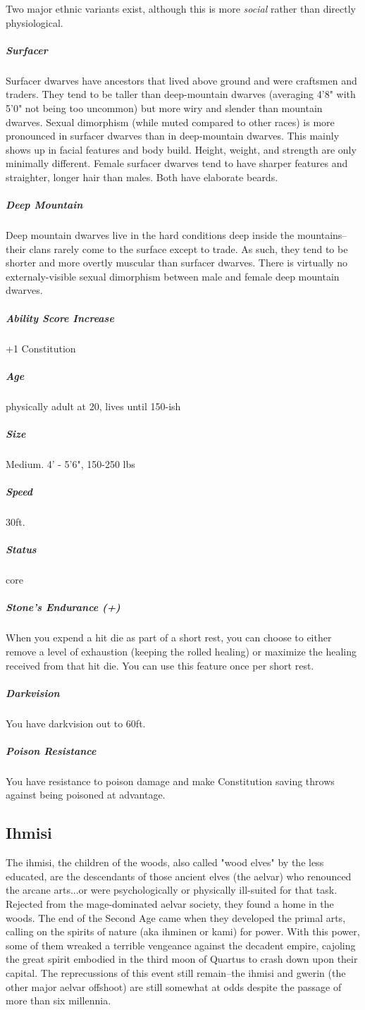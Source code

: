 Two major ethnic variants exist, although this is more \textit{social} rather than directly physiological.

\subparagraph*{Surfacer} Surfacer dwarves have ancestors that lived above ground and were craftsmen and traders. They tend to be taller than deep-mountain dwarves (averaging 4'8" with 5'0" not being too uncommon) but more wiry and slender than mountain dwarves. Sexual dimorphism (while muted compared to other races) is more pronounced in surfacer dwarves than in deep-mountain dwarves. This mainly shows up in facial features and body build. Height, weight, and strength are only minimally different. Female surfacer dwarves tend to have sharper features and straighter, longer hair than males. Both have elaborate beards.

\subparagraph*{Deep Mountain} Deep mountain dwarves live in the hard conditions deep inside the mountains--their clans rarely come to the surface except to trade. As such, they tend to be shorter and more overtly muscular than surfacer dwarves. There is virtually no externaly-visible sexual dimorphism between male and female deep mountain dwarves.

\subparagraph*{Ability Score Increase}  +1 Constitution

\subparagraph*{Age}  physically adult at 20, lives until 150-ish

\subparagraph*{Size}  Medium. 4' - 5'6", 150-250 lbs

\subparagraph*{Speed}  30ft.

\subparagraph*{Status}  core

\subparagraph*{Stone's Endurance (+)}  When you expend a hit die as part of a short rest, you can choose to either remove a level of exhaustion (keeping the rolled healing) or maximize the healing received from that hit die. You can use this feature once per short rest.

\subparagraph*{Darkvision}  You have darkvision out to 60ft.

\subparagraph*{Poison Resistance}  You have resistance to poison damage and make Constitution saving throws against being poisoned at advantage.

\subsection{Ihmisi} \label{lineage:ihmisi}
The ihmisi, the children of the woods, also called "wood elves" by the less educated, are the descendants of those ancient elves (the aelvar) who renounced the arcane arts...or were psychologically or physically ill-suited for that task. Rejected from the mage-dominated aelvar society, they found a home in the woods. The end of the Second Age came when they developed the primal arts, calling on the spirits of nature (aka ihminen or kami) for power. With this power, some of them wreaked a terrible vengeance against the decadent empire, cajoling the great spirit embodied in the third moon of Quartus to crash down upon their capital. The reprecussions of this event still remain--the ihmisi and gwerin (the other major aelvar offshoot) are still somewhat at odds despite the passage of more than six millennia.

